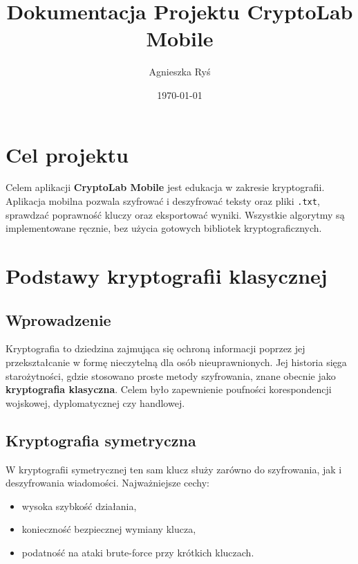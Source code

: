 \documentclass[12pt,a4paper]{article}
\title{Dokumentacja Projektu CryptoLab Mobile}
\author{Agnieszka Ryś}
\date{\today}
\begin{document}
\maketitle
\tableofcontents

\newpage
\section{Cel projektu}
Celem aplikacji \textbf{CryptoLab Mobile} jest edukacja w zakresie kryptografii. 
Aplikacja mobilna pozwala szyfrować i deszyfrować teksty oraz pliki \texttt{.txt}, 
sprawdzać poprawność kluczy oraz eksportować wyniki. 
Wszystkie algorytmy są implementowane ręcznie, bez użycia gotowych bibliotek kryptograficznych.

\section{Podstawy kryptografii klasycznej}

\subsection*{Wprowadzenie}
Kryptografia to dziedzina zajmująca się ochroną informacji poprzez jej przekształcanie w formę nieczytelną dla osób nieuprawnionych. 
Jej historia sięga starożytności, gdzie stosowano proste metody szyfrowania, znane obecnie jako \textbf{kryptografia klasyczna}. 
Celem było zapewnienie poufności korespondencji wojskowej, dyplomatycznej czy handlowej. 

\subsection{Kryptografia symetryczna}
W kryptografii symetrycznej ten sam klucz służy zarówno do szyfrowania, jak i deszyfrowania wiadomości. 
Najważniejsze cechy:
\begin{itemize}
    \item wysoka szybkość działania,
    \item konieczność bezpiecznej wymiany klucza,
    \item podatność na ataki brute-force przy krótkich kluczach.
\end{itemize}
\end{document}
